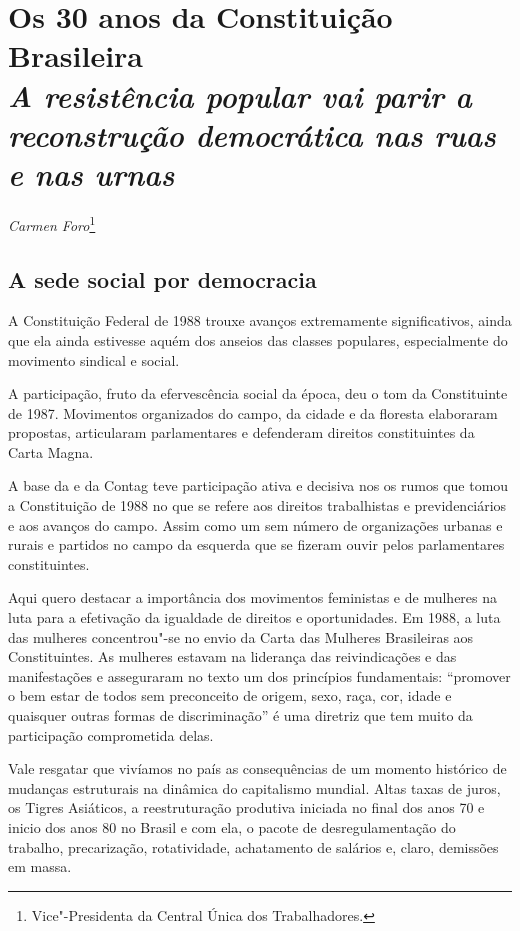 \chapter*{Os 30 anos da Constituição Brasileira\\
\emph{A resistência popular vai parir a reconstrução democrática nas
ruas e nas urnas}}


\begin{flushright}
\emph{Carmen Foro}\footnote{Vice"-Presidenta da Central Única dos Trabalhadores.}
\end{flushright}

\section{A sede social por democracia}

A Constituição Federal de 1988 trouxe avanços extremamente
significativos, ainda que ela ainda estivesse aquém dos anseios das
classes populares, especialmente do movimento sindical e social.

A participação, fruto da efervescência social da época, deu o tom da
Constituinte de 1987. Movimentos organizados do campo, da cidade e da
floresta elaboraram propostas, articularam parlamentares e defenderam
direitos constituintes da Carta Magna.

A base da  e da Contag teve participação ativa e decisiva nos os
rumos que tomou a Constituição de 1988 no que se refere aos direitos
trabalhistas e previdenciários e aos avanços do campo. Assim como um sem
número de organizações urbanas e rurais e partidos no campo da esquerda
que se fizeram ouvir pelos parlamentares constituintes.

Aqui quero destacar a importância dos movimentos feministas e de
mulheres na luta para a efetivação da igualdade de direitos e
oportunidades. Em 1988, a luta das mulheres concentrou"-se no
envio da Carta das Mulheres Brasileiras aos
Constituintes. As mulheres estavam na liderança das reivindicações e das
manifestações e asseguraram no texto um dos princípios fundamentais:
``promover o bem estar de todos sem preconceito de origem, sexo, raça,
cor, idade e quaisquer outras formas de discriminação'' é uma diretriz
que tem muito da participação comprometida delas.

Vale resgatar que vivíamos no país as consequências de um momento
histórico de mudanças estruturais na dinâmica do capitalismo mundial.
Altas taxas de juros, os Tigres Asiáticos, a reestruturação produtiva
iniciada no final dos anos 70 e inicio dos anos 80 no Brasil e com ela,
o pacote de desregulamentação do trabalho, precarização, rotatividade,
achatamento de salários e, claro, demissões em massa.

